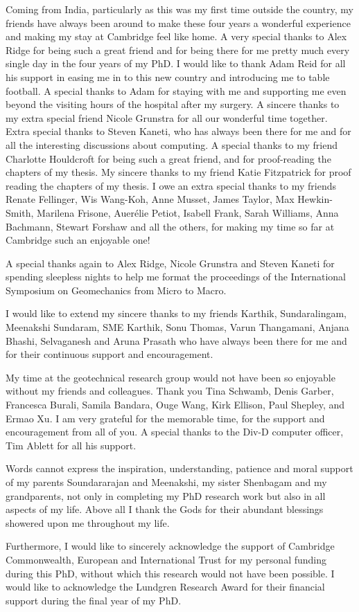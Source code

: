 \begin{acknowledgements}
Coming from India, particularly as this was my first time outside the country, 
my friends have always been around to make these four years a wonderful 
experience and making my stay at Cambridge feel like home. A very special 
thanks to Alex Ridge for being such a great friend 
and for being there for me pretty much every single day in the four years of my
PhD. I would like to thank Adam Reid for all his support in easing me in to 
this new country and introducing me to table football. A special thanks to Adam 
for staying with me and supporting me even beyond the visiting hours of the 
hospital after my surgery. A sincere thanks to my extra special friend Nicole 
Grunstra for all our wonderful time together. Extra special thanks to Steven 
Kaneti, who has always been there for me and for all the interesting 
discussions about computing. A special thanks to my friend Charlotte Houldcroft 
for being such a great friend, and for proof-reading the chapters of my thesis. 
My sincere thanks to my friend Katie Fitzpatrick for proof reading the chapters 
of my thesis. I owe an extra special thanks to my friends Renate Fellinger,
Wis Wang-Koh, Anne Musset, James Taylor, Max Hewkin-Smith, Marilena Frisone, 
Auer\'{e}lie Petiot, Isabell Frank, Sarah Williams, Anna Bachmann, Stewart 
Forshaw and all the others, for making my time so far at Cambridge such an 
enjoyable one!

A special thanks again to Alex Ridge, Nicole Grunstra and Steven Kaneti for 
spending sleepless nights to help me format the proceedings of the 
International Symposium on Geomechanics from Micro to Macro. 

I would like to extend my sincere thanks to my friends Karthik, 
Sundaralingam, Meenakshi Sundaram, SME Karthik, Sonu Thomas, Varun Thangamani, 
Anjana Bhashi,  Selvaganesh and Aruna Prasath who have always been there for 
me and for their continuous support and encouragement.

My time at the geotechnical research group would not have been so enjoyable 
without my friends and colleagues. Thank you Tina Schwamb, Denis Garber,
Francesca Burali, Samila Bandara, Ouge Wang, Kirk Ellison, Paul 
Shepley, and Ermao Xu. I am very grateful for the memorable time, 
for the support and encouragement from all of you. A special thanks to the 
Div-D computer officer, Tim Ablett for all his support.

Words cannot express the inspiration, understanding, patience and moral support 
of my parents Soundararajan and Meenakshi, my sister Shenbagam and my 
grandparents, not only in completing my PhD research work but also in all 
aspects of my life. Above all I thank the Gods for their abundant blessings 
showered upon me throughout my life.

Furthermore, I would like to sincerely acknowledge the support of Cambridge 
Commonwealth, European and International Trust for my personal funding during 
this PhD, without which this research would not have been possible. I would 
like to acknowledge the Lundgren Research Award for their financial support 
during the final year of my PhD.

\end{acknowledgements}
